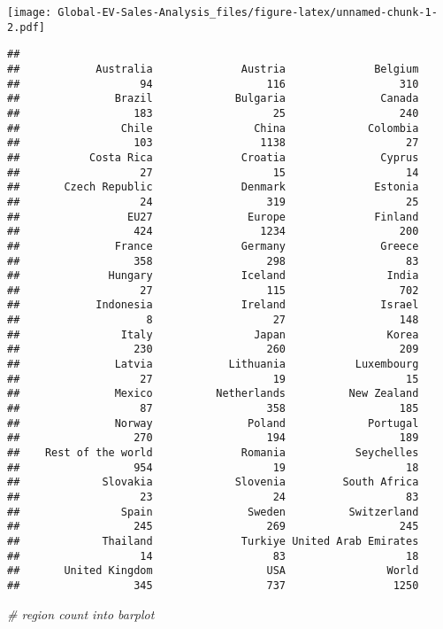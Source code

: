 \documentclass[
]{article}
\newenvironment{Shaded}{\begin{snugshade}}{\end{snugshade}}
\newcommand{\CommentTok}[1]{\textcolor[rgb]{0.56,0.35,0.01}{\textit{#1}}}
\newcommand{\FunctionTok}[1]{\textcolor[rgb]{0.13,0.29,0.53}{\textbf{#1}}}
\newcommand{\NormalTok}[1]{#1}
\newcommand{\OtherTok}[1]{\textcolor[rgb]{0.56,0.35,0.01}{#1}}
\newcommand{\SpecialCharTok}[1]{\textcolor[rgb]{0.81,0.36,0.00}{\textbf{#1}}}
\begin{document}
\texttt{[image: Global-EV-Sales-Analysis\_files/figure-latex/unnamed-chunk-1-2.pdf]}

\begin{Shaded}
\end{Shaded}

\begin{verbatim}
## 
##            Australia              Austria              Belgium 
##                   94                  116                  310 
##               Brazil             Bulgaria               Canada 
##                  183                   25                  240 
##                Chile                China             Colombia 
##                  103                 1138                   27 
##           Costa Rica              Croatia               Cyprus 
##                   27                   15                   14 
##       Czech Republic              Denmark              Estonia 
##                   24                  319                   25 
##                 EU27               Europe              Finland 
##                  424                 1234                  200 
##               France              Germany               Greece 
##                  358                  298                   83 
##              Hungary              Iceland                India 
##                   27                  115                  702 
##            Indonesia              Ireland               Israel 
##                    8                   27                  148 
##                Italy                Japan                Korea 
##                  230                  260                  209 
##               Latvia            Lithuania           Luxembourg 
##                   27                   19                   15 
##               Mexico          Netherlands          New Zealand 
##                   87                  358                  185 
##               Norway               Poland             Portugal 
##                  270                  194                  189 
##    Rest of the world              Romania           Seychelles 
##                  954                   19                   18 
##             Slovakia             Slovenia         South Africa 
##                   23                   24                   83 
##                Spain               Sweden          Switzerland 
##                  245                  269                  245 
##             Thailand              Turkiye United Arab Emirates 
##                   14                   83                   18 
##       United Kingdom                  USA                World 
##                  345                  737                 1250
\end{verbatim}

\begin{Shaded}
\begin{Highlighting}[]
\CommentTok{\# region count into barplot}
\end{Highlighting}
\end{Shaded}
\end{document}
